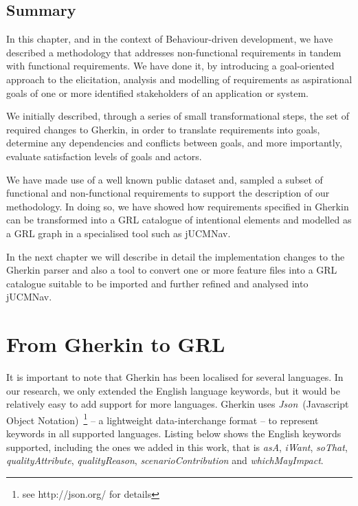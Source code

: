 \documentclass[dissertation,final]{softeng}
\newcommand{\nfrs}{non-functional requirements\xspace}
\begin{document}
\section{Summary}
In this chapter, and in the context of Behaviour-driven development, we have described a methodology that addresses \nfrs in tandem with functional requirements. We have done it, by introducing a goal-oriented approach to the elicitation, analysis and modelling of requirements as aspirational goals of one or more identified stakeholders of an application or system.

We initially described, through a series of small transformational steps, the set of required changes to Gherkin, in order to translate requirements into goals, determine any dependencies and conflicts between goals, and more importantly, evaluate satisfaction levels of goals and actors.

We have made use of a well known public dataset and, sampled a subset of functional and non-functional requirements to support the description of our methodology. In doing so, we have showed how requirements specified in Gherkin can be transformed into a GRL catalogue of intentional elements and modelled as a GRL graph in a specialised tool such as jUCMNav.

In the next chapter we will describe in detail the implementation changes to the Gherkin parser and also a tool to convert one or more feature files into a GRL catalogue suitable to be imported and further refined and analysed into jUCMNav.

\chapter{From Gherkin to GRL}
\label{ch:gherkin_redux}

It is important to note that Gherkin has been localised for several languages. In our research, we only extended the English language keywords, but it would be relatively easy to add support for more languages. Gherkin uses \emph{Json}~(Javascript Object Notation)~\footnote{see http://json.org/ for details} -- a lightweight data-interchange format -- to represent keywords in all supported languages. Listing below shows the English keywords supported, including the ones we added in this work, that is \emph{asA}, \emph{iWant}, \emph{soThat}, \emph{qualityAttribute}, \emph{qualityReason}, \emph{scenarioContribution} and \emph{whichMayImpact}.
\end{document}
